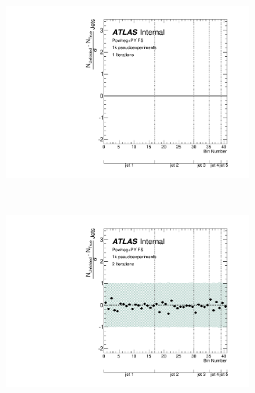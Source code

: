 \clearpage
\begin{figure}
\begin{subfigure}[]{0.5\textwidth}
\includegraphics[width=\textwidth]{fig/Stress/117050fullsim/Pull1Iterations.pdf}
\end{subfigure}
~
\begin{subfigure}[]{0.5\textwidth}
\includegraphics[width=\textwidth]{fig/Stress/117050fullsim/Pull2Iterations.pdf}
\end{subfigure}
\\
\begin{subfigure}[]{0.5\textwidth}

\end{subfigure}
\end{figure}
